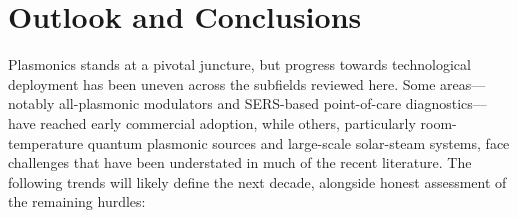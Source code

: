 \documentclass[twocolumn,10pt]{article}
\begin{document}
\section{Outlook and Conclusions}
\label{sec:conclusions}

Plasmonics stands at a pivotal juncture, but progress towards
technological deployment has been uneven across the subfields reviewed
here.  Some areas---notably all-plasmonic modulators and SERS-based
point-of-care diagnostics---have reached early commercial adoption,
while others, particularly room-temperature quantum plasmonic sources
and large-scale solar-steam systems, face challenges that have been
understated in much of the recent literature.  The following trends
will likely define the next decade, alongside honest assessment of the
remaining hurdles:
\end{document}
